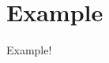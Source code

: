 \documentclass[12pt]{article}
\begin{document}
\section{Example} \label{1.1.ex1}

Example!
\end{document}

